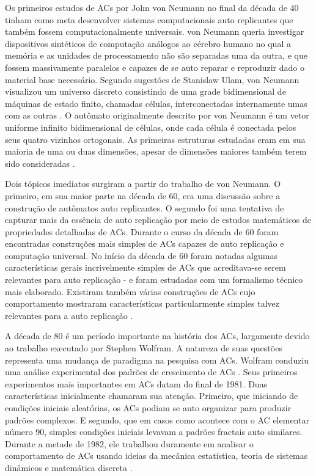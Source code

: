\documentclass[12pt,a4paper]{article}
\begin{document}
Os primeiros estudos de ACs por John von Neumann no final da década de
40 tinham como meta desenvolver sistemas computacionais auto replicantes que também fossem
computacionalmente universais. von Neumann queria investigar dispositivos sintéticos de
computação análogos ao cérebro humano no qual a memória e as unidades de processamento
não são separadas uma da outra, e que fossem massivamente paralelos e capazes de se
auto reparar e reproduzir dado o material base necessário. Segundo sugestões de
Stanislaw Ulam, von Neumann visualizou um universo discreto consistindo de uma grade
bidimensional de máquinas de estado finito, chamadas células, interconectadas
internamente umas com as outras . O autômato originalmente descrito por
von Neumann é um vetor uniforme infinito bidimensional de células, onde cada célula é
conectada pelos seus quatro vizinhos ortogonais. As primeiras estruturas estudadas eram
em sua maioria de uma ou duas dimensões, apesar de dimensões maiores também terem sido
consideradas .

Dois tópicos imediatos surgiram a partir do trabalho de von Neumann. O primeiro, em
sua maior parte na década de 60, era uma discussão sobre a construção de autômatos
auto replicantes. O segundo foi uma tentativa de capturar mais da essência de
auto replicação por meio de estudos matemáticos de propriedades detalhadas de
ACs. Durante o curso da década de 60 foram encontradas construções
mais simples de ACs capazes de auto replicação e computação
universal. No início da década de 60 foram notadas algumas características gerais
incrivelmente simples de ACs que acreditava-se serem relevantes para
auto replicação - e foram estudadas com um formalismo técnico mais elaborado. Existiram
também várias construções de ACs cujo comportamento mostraram
características particularmente simples talvez relevantes para a auto
replicação .

A década de 80 é um período importante na história dos ACs,
largamente devido ao trabalho executado por Stephen Wolfram. A natureza de suas questões
representa uma mudança de paradigma na pesquisa com ACs. Wolfram conduziu
uma análise experimental dos padrões de crescimento de ACs
. Seus primeiros experimentos mais importantes em ACs
datam do final de 1981. Duas características inicialmente chamaram sua atenção.
Primeiro, que iniciando de condições iniciais aleatórias, os ACs
podiam se auto organizar para produzir padrões complexos. E segundo, que em casos
como acontece com o AC elementar número 90, simples condições iniciais levavam a
padrões fractais auto similares.
Durante a metade de 1982, ele trabalhou duramente em analisar o comportamento de
ACs usando ideias da mecânica estatística, teoria de sistemas
dinâmicos e matemática discreta .
\end{document}
